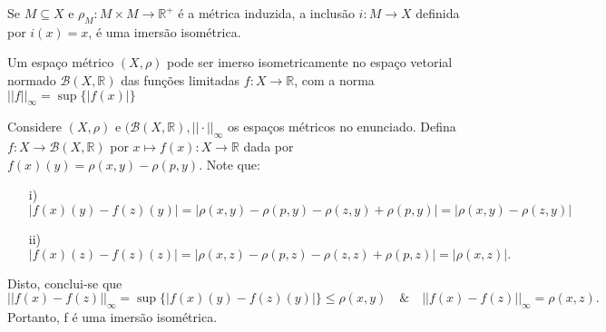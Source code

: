 \documentclass[MetricSpaces/metric_notes.tex]{subfiles}
\begin{document}
\begin{example}
	Se \(M\subseteq{X}\) e \(\rho _{M}:M\times M\rightarrow \mathbb{R}^{+}\) é a métrica induzida, a inclusão
	\(i:M\rightarrow X\) definida por \(i(x) = x\), é uma imersão isométrica.
\end{example}
\begin{prop*}
	Um espaço métrico \((X, \rho )\) pode ser imerso isometricamente no espaço vetorial normado \(\mathcal{B}(X, \mathbb{R})\) das funções limitadas \(f:X\rightarrow \mathbb{R}\), com a norma
	\(||f||_{\infty}=\sup\{|f(x)|\}\)
\end{prop*}
\begin{proof*}
	Considere \((X, \rho )\) e \((\mathcal{B}(X, \mathbb{R}), ||\cdot ||_{\infty}\) os espaços métricos no enunciado. Defina
	\(f:X\rightarrow \mathcal{B}(X, \mathbb{R})\) por \(x\mapsto f(x):X\rightarrow \mathbb{R}\) dada por
	\(f(x)(y) = \rho (x, y)-\rho (p, y).\) Note que:
	\begin{itemize}
		\item[i)] \(|f(x)(y) - f(z)(y)| = |\rho (x, y)-\rho (p, y)-\rho (z, y) + \rho (p, y)| = |\rho (x, y)-\rho (z, y)|\)
		\item[ii)] \(|f(x)(z)-f(z)(z)| = |\rho (x, z) - \rho (p, z) - \rho (z, z) + \rho (p,z)| = |\rho (x, z)|.\)
	\end{itemize}
	Disto, conclui-se que
	\[
		||f(x)-f(z)||_{\infty} = \sup\{|f(x)(y) - f(z)(y)|\}\leq \rho (x, y)\quad\&\quad ||f(x)-f(z)||_{\infty} = \rho (x, z).
	\]
	Portanto, f é uma imersão isométrica. \qedsymbol
\end{proof*}
\end{document}
